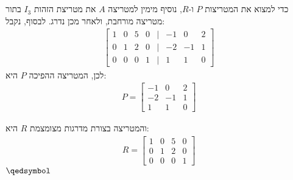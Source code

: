 \documentclass[a4paper, 12pt, leqno]{article}
\newcommand{\eq}[1]{\begin{align*}#1\end{align*}}
\renewcommand{\qed}{\hfill\(\qedsymbol\)}
\begin{document}
\section{}
כדי למצוא את המטריצות $P$ ו-$R$, נוסיף מימין למטריצה $A$ את מטריצת הזהות $I_3$ בתור מטריצה מורחבת, ולאחר מכן נדרג.
לבסוף, נקבל:
\eq{
    \begin{bmatrix}
    1 & 0 & 5 & 0 &|& -1 & 0 & 2\\
    0 & 1 & 2 & 0 &|& -2 & -1 & 1\\
    0 & 0 & 0 & 1 &|& 1 & 1 & 0
    \end{bmatrix}
}
לכן, המטריצה ההפיכה $P$ היא:
\eq{
    P=\begin{bmatrix}
    -1 & 0 & 2\\
    -2 & -1 & 1\\
    1 & 1 & 0
    \end{bmatrix}
}

והמטריצה בצורת מדרגות מצומצמת $R$ היא:
\eq{
    R=\begin{bmatrix}
        1 & 0 & 5 & 0\\
        0 & 1 & 2 & 0\\
        0 & 0 & 0 & 1
    \end{bmatrix}
}
\qed

\end{document}
